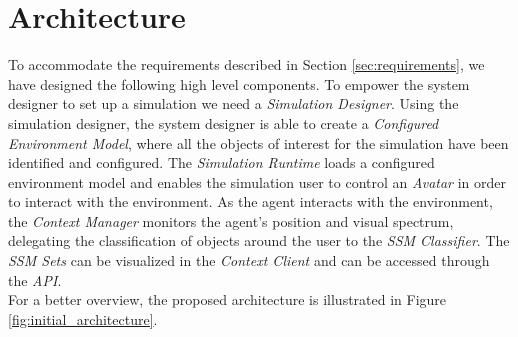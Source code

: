 \section{Architecture} %
\label{sec:architecture}
To accommodate the requirements described in Section \ref{sec:requirements}, we have designed the following high level components. To empower the system designer to set up a simulation we need a \emph{Simulation Designer}. Using the simulation designer, the system designer is able to create a \emph{Configured Environment Model}, where all the objects of interest for the simulation have been identified and configured. The \emph{Simulation Runtime} loads a configured environment model and enables the simulation user to control an \emph{Avatar} in order to interact with the environment. As the agent interacts with the environment, the \emph{Context Manager} monitors the agent's position and visual spectrum, delegating the classification of objects around the user to the \emph{SSM Classifier}. The \emph{SSM Sets} can be visualized in the \emph{Context Client} and can be accessed through the \emph{API}.\\

For a better overview, the proposed architecture is illustrated in Figure \ref{fig:initial_architecture}.

